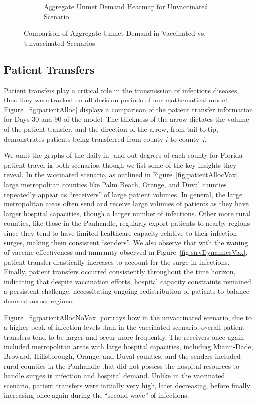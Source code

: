 \documentclass{article}
\begin{document}
\begin{figure}
\begin{subfigure}{0.43\linewidth}
        \caption{Aggregate Unmet Demand Heatmap for Unvaccinated Scenario}\label{fig:udHeatmapNoVax}
    \end{subfigure}
    \caption{Comparison of Aggregate Unmet Demand in Vaccinated vs. Unvaccinated Scenarios}\label{fig:udHeatmap}
\end{figure}


\subsection{Patient Transfers}
Patient transfers play a critical role in the transmission of infectious diseases, thus they were tracked on all decision periods of our mathematical model. Figure~\ref{fig:patientAlloc} displays a comparison of the patient transfer information for Days 30 and 90 of the model. The thickness of the arrow dictates the volume of the patient transfer, and the direction of the arrow, from tail to tip, demonstrates patients being transferred from county $i$ to county $j$.  

We omit the graphs of the daily in- and out-degrees of each county for Florida patient travel in both scenarios, though we list some of the key insights they reveal. In the vaccinated scenario, as outlined in Figure~\ref{fig:patientAllocVax}, large metropolitan counties like Palm Beach, Orange, and Duval counties repeatedly appear as ``receivers'' of large patient volumes. In general, the large metropolitan areas often send and receive large volumes of patients as they have larger hospital capacities, though a larger number of infections. Other more rural counties, like those in the Panhandle, regularly export patients to nearby regions since they tend to have limited healthcare capacity relative to their infection surges, making them consistent ``senders''. We also observe that with the waning of vaccine effectiveness and immunity observed in Figure~\ref{fig:sirvDynamicsVax}, patient transfer drastically increases to account for the surge in infections. Finally, patient transfers occurred consistently throughout the time horizon, indicating that despite vaccination efforts, hospital capacity constraints remained a persistent challenge, necessitating ongoing redistribution of patients to balance demand across regions. 

Figure~\ref{fig:patientAllocNoVax} portrays how in the unvaccinated scenario, due to a higher peak of infection levels than in the vaccinated scenario, overall patient transfers tend to be larger and occur more frequently. The receivers once again included metropolitan areas with large hospital capacities, including Miami-Dade, Broward, Hillsborough, Orange, and Duval counties, and the senders included rural counties in the Panhandle that did not possess the hospital resources to handle surges in infection and hospital demand. Unlike in the vaccinated scenario, patient transfers were initially very high, later decreasing, before finally increasing once again during the ``second wave'' of infections. 
\end{document}
